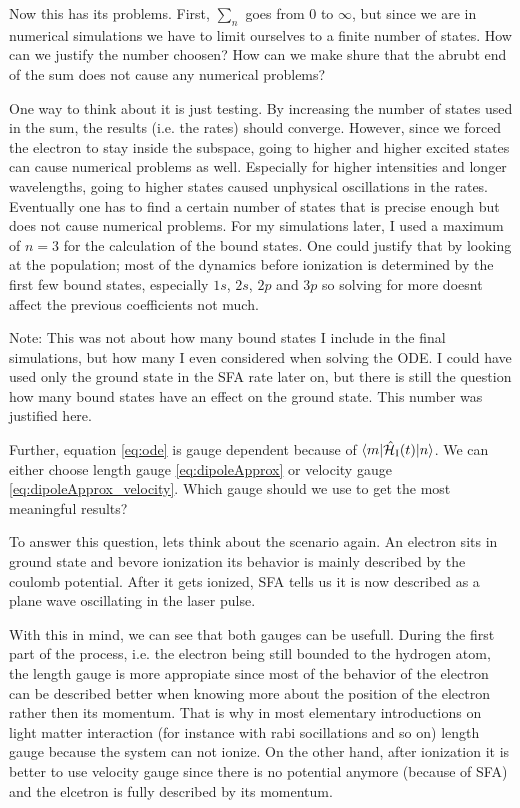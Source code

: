\bigskip
Now this has its problems.
First, $\sum_n$ goes from $0$ to $\infty$, but since we are in numerical simulations we have to limit ourselves to a finite number of states.
How can we justify the number choosen?
How can we make shure that the abrubt end of the sum does not cause any numerical problems?

One way to think about it is just testing.
By increasing the number of states used in the sum, the results (i.e. the rates) should converge.
However, since we forced the electron to stay inside the subspace, going to higher and higher excited states can cause numerical problems as well.
Especially for higher intensities and longer wavelengths, going to higher states caused unphysical oscillations in the rates. 
Eventually one has to find a certain number of states that is precise enough but does not cause numerical problems.
For my simulations later, I used a maximum of $n=3$ for the calculation of the bound states.
One could justify that by looking at the population; most of the dynamics before ionization is determined by the first few bound states, especially $1s$, $2s$, $2p$ and $3p$ so solving for more doesnt affect the previous coefficients not much.

Note: This was not about how many bound states I include in the final simulations, but how many I even considered when solving the ODE.
I could have used only the ground state in the SFA rate later on, but there is still the question how many bound states have an effect on the ground state. 
This number was justified here.


\bigskip
Further, equation \eqref{eq:ode} is gauge dependent because of $\braket{m|\hat{\mathcal{H}}_{\mathrm{I}}(t)|n}$. 
We can either choose length gauge \eqref{eq:dipoleApprox} or velocity gauge \eqref{eq:dipoleApprox_velocity}.
Which gauge should we use to get the most meaningful results?

To answer this question, lets think about the scenario again.
An electron sits in ground state and bevore ionization its behavior is mainly described by the coulomb potential.
After it gets ionized, SFA tells us it is now described as a plane wave oscillating in the laser pulse.

With this in mind, we can see that both gauges can be usefull.
During the first part of the process, i.e. the electron being still bounded to the hydrogen atom, the length gauge is more appropiate since most of the behavior of the electron can be described better when knowing more about the position of the electron rather then its momentum.
That is why in most elementary introductions on light matter interaction (for instance with rabi socillations and so on) length gauge because the system can not ionize.
On the other hand, after ionization it is better to use velocity gauge since there is no potential anymore (because of SFA) and the elcetron is fully described by its momentum.

